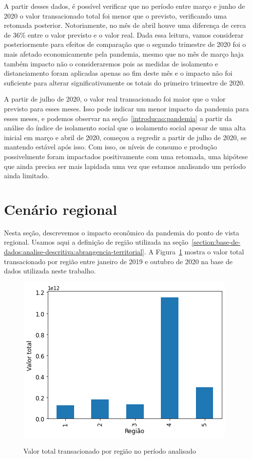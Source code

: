 A partir desses dados, é possível verificar que no período entre março e junho de 2020 o valor transacionado total foi menor que o previsto, verificando uma retomada posterior. Notoriamente, no mês de abril houve uma diferença de cerca de 36\% entre o valor previsto e o valor real. Dada essa leitura, vamos considerar posteriormente para efeitos de comparação que o segundo trimestre de 2020 foi o mais afetado economicamente pela pandemia, mesmo que no mês de março haja também impacto não o consideraremos pois as medidas de isolamento e distanciamento foram aplicadas apenas ao fim deste mês e o impacto não foi suficiente para alterar significativamente os totais do primeiro trimestre de 2020.

A partir de julho de 2020, o valor real transacionado foi maior que o valor previsto para esses meses. Isso pode indicar um menor impacto da pandemia para esses meses, e podemos observar na seção~\ref{introducao:pandemia} a partir da análise do índice de isolamento social que o isolamento social apesar de uma alta inicial em março e abril de 2020, começou a regredir a partir de julho de 2020, se mantendo estável após isso. Com isso, os níveis de consumo e produção possivelmente foram impactados positivamente com uma retomada, uma hipótese que ainda precisa ser mais lapidada uma vez que estamos analisando um período ainda limitado.

\section{Cenário regional}
\label{section:impacto:cenario-regional}

Nesta seção, descrevemos o impacto econômico da pandemia do ponto de vista regional. Usamos aqui a definição de região utilizada na seção~\ref{section:base-de-dados:analise-descritiva:abrangencia-territorial}. A Figura~\ref{fig:pandemia:base-de-dados-11.1-valor-total-por-regiao} mostra o valor total transacionado por região entre janeiro de 2019 e outubro de 2020 na base de dados utilizada neste trabalho.

\begin{figure}[htb]
	\centering
    \caption{Valor total transacionado por região no período analisado}
    \includegraphics[scale=0.7]{images/base-de-dados-11.1-valor-total-por-regiao.png}
    \label{fig:pandemia:base-de-dados-11.1-valor-total-por-regiao}
    \fdadospesquisa
\end{figure}

